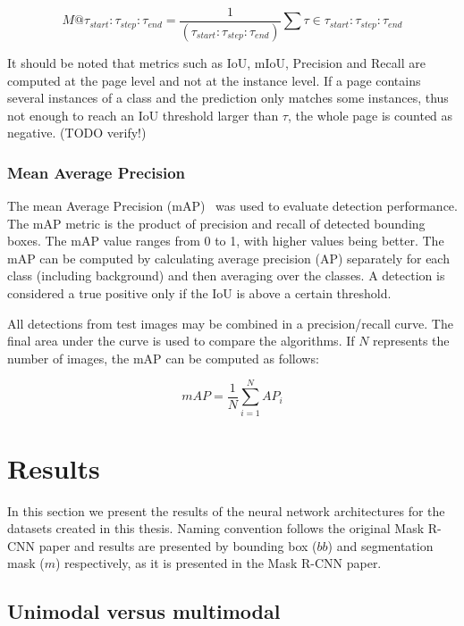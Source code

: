 \documentclass[english, bibtex]{kththesis}
\begin{document}
\begin{equation}
M@\tau_{start}:\tau_{step}:\tau_{end} = \frac{1}{(\tau_{start}:\tau_{step}:\tau_{end})} \sum{} \tau \in \tau_{start}:\tau_{step}:\tau_{end}
    \label{eqn:rangem}
\end{equation}

It should be noted that metrics such as IoU, mIoU, Precision and Recall are computed at the page level and not at the instance level. If a page contains several instances of a class and the prediction only matches some instances, thus not enough to reach an IoU threshold larger than $\tau$, the whole page is counted as negative. (TODO verify!)


\subsection{Mean Average Precision}

The mean Average Precision (mAP)~\cite{zhang2009average} was used to evaluate detection performance. The mAP metric is the product of precision and recall of detected bounding boxes. The mAP value ranges from 0 to 1, with higher values being better. The mAP can be computed by calculating average precision (AP) separately for each class (including background) and then averaging over the classes. A detection is considered a true positive only if the IoU is above a certain threshold. 

All detections from test images may be combined in a precision/recall curve. The final area under the curve is used to compare the algorithms. If $N$ represents the number of images, the mAP can be computed as follows:

\begin{equation}
mAP = \frac{1}{N} \sum_{i=1}^{N} AP_i
    \label{eqn:map}
\end{equation}


\chapter{Results}

In this section we present the results of the neural network architectures for the datasets created in this thesis. Naming convention follows the original Mask R-CNN paper and results are presented by bounding box ($bb$) and segmentation mask ($m$) respectively, as it is presented in the Mask R-CNN paper.

\section{Unimodal versus multimodal}
\end{document}
